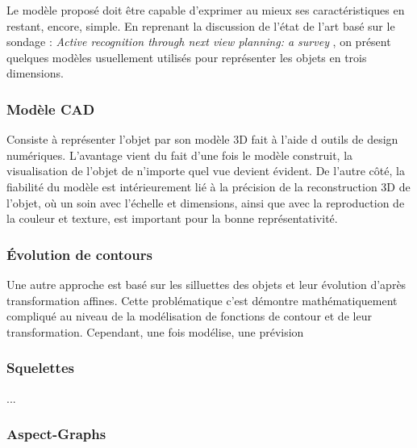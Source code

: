 Le modèle proposé doit être capable d'exprimer au
mieux ses caractéristiques en restant, encore, simple.  En reprenant la
discussion de l'état de l'art basé sur le sondage : 
\textit{Active recognition through next view planning: a survey}
, on présent quelques modèles usuellement
utilisés pour représenter les objets en trois dimensions.

\subsubsection{Modèle CAD}

Consiste à représenter l'objet par son modèle 3D fait à l'aide d
outils de design numériques. L'avantage vient du fait d'une fois le
modèle construit, la visualisation de l'objet de n'importe quel vue
devient évident. De l'autre côté, la fiabilité du modèle est
intérieurement lié à la précision de la reconstruction 3D de l'objet,
où un soin avec l'échelle et dimensions, ainsi que avec la
reproduction de la couleur et texture, est important pour la bonne
représentativité.

\subsubsection{Évolution de contours}

Une autre approche est basé sur les silluettes des objets et leur
évolution d'après transformation affines. Cette problématique c'est
démontre mathématiquement compliqué au niveau de la modélisation de
fonctions de contour et de leur transformation. Cependant, une fois
modélise, une prévision

\subsubsection{Squelettes}
...

\subsubsection{Aspect-Graphs}

